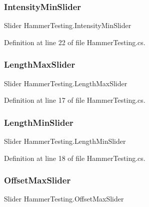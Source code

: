 \subsubsection{\texorpdfstring{Intensity\+Min\+Slider}{IntensityMinSlider}}
{\footnotesize\ttfamily Slider Hammer\+Testing.\+Intensity\+Min\+Slider}



Definition at line 22 of file Hammer\+Testing.\+cs.

\mbox{\label{class_hammer_testing_a8c3b0e8d4e84e3053a66abfebbc4d0c1}} 
\subsubsection{\texorpdfstring{Length\+Max\+Slider}{LengthMaxSlider}}
{\footnotesize\ttfamily Slider Hammer\+Testing.\+Length\+Max\+Slider}



Definition at line 17 of file Hammer\+Testing.\+cs.

\mbox{\label{class_hammer_testing_a978596a3342162e9bbee44ad80bb42fa}} 
\subsubsection{\texorpdfstring{Length\+Min\+Slider}{LengthMinSlider}}
{\footnotesize\ttfamily Slider Hammer\+Testing.\+Length\+Min\+Slider}



Definition at line 18 of file Hammer\+Testing.\+cs.

\mbox{\label{class_hammer_testing_a10524c931369a89a1ac20aa9e1923d3b}} 
\subsubsection{\texorpdfstring{Offset\+Max\+Slider}{OffsetMaxSlider}}
{\footnotesize\ttfamily Slider Hammer\+Testing.\+Offset\+Max\+Slider}



